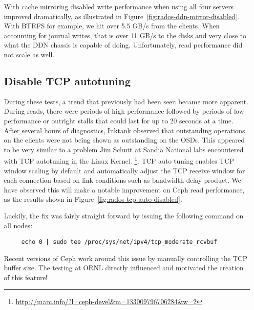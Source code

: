 \documentclass{article}
\begin{document}
With cache mirroring disabled write performance when using all four servers
improved dramatically, as illustrated in
Figure~\ref{fig:rados-ddn-mirror-disabled}. With BTRFS for example, we hit over
5.5 GB/s from the clients.  When accounting for journal writes, that is over
11 GB/s to the disks and very close to what the DDN chassis is capable of doing. 
Unfortunately, read performance did not scale as well.


\subsection{Disable TCP autotuning}

During these tests, a trend that previously had been seen became more apparent.
During reads, there were periods of high performance followed by periods of low
performance or outright stalls that could last for up to 20 seconds at a time. 
After several hours of diagnostics, Inktank observed that outstanding operations
on the clients were not being shown as outstanding on the OSDs.  This appeared
to be very similar to a problem Jim Schutt at Sandia National labs encountered
with TCP autotuning in the Linux Kernel.
\footnote{\url{http://marc.info/?l=ceph-devel&m=133009796706284&w=2}}.
TCP auto tuning enables TCP window scaling by default and automatically adjust
the TCP receive window for each connection based on link conditions such as
bandwidth delay product. We have observed this will make a notable improvement
on Ceph read performance, as the results shown in
Figure~\ref{fig:rados-tcp-auto-disabled}.


Luckily, the fix was fairly straight forward by issuing the following command on all nodes:

\begin{Verbatim}
     echo 0 | sudo tee /proc/sys/net/ipv4/tcp_moderate_rcvbuf
\end{Verbatim}

Recent versions of Ceph work around this issue by manually controlling the TCP
buffer size.  The testing at ORNL directly influenced and motivated the creation
of this feature!
\end{document}
